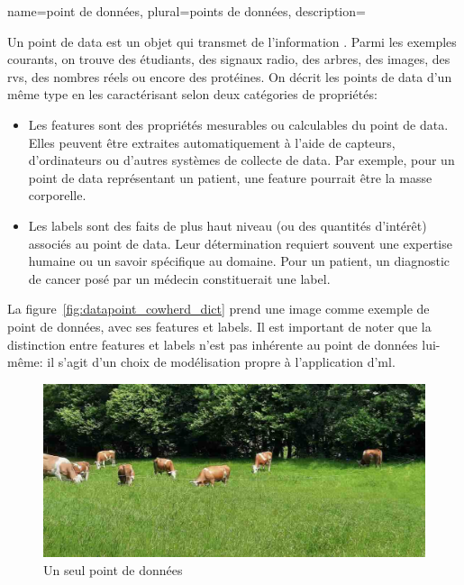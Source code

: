 {name={point de données}, 
	plural={points de données},
	description={Un point de \gls{data} est un objet qui transmet de l'information \cite{coverthomas}. 
		Parmi les exemples courants, on trouve des étudiants, des signaux radio, des arbres, des images, 
		des \glspl{rv}, des nombres réels ou encore des protéines. On décrit les points de \gls{data} d’un même type en les caractérisant selon deux catégories de propriétés:
		\begin{itemize}
			\item Les \glspl{feature} sont des propriétés mesurables ou calculables du point de \gls{data}. 
			Elles peuvent être extraites automatiquement à l’aide de capteurs, d’ordinateurs ou d’autres 
			systèmes de collecte de \gls{data}. Par exemple, pour un point de \gls{data} représentant un patient, 
			une \gls{feature} pourrait être la masse corporelle.
			\item Les \glspl{label} sont des faits de plus haut niveau (ou des quantités d’intérêt) 
			associés au point de \gls{data}. Leur détermination requiert souvent une expertise humaine ou 
			un savoir spécifique au domaine. Pour un patient, un diagnostic de cancer posé par un médecin 
			constituerait une \gls{label}.
		\end{itemize}
		La figure~\ref{fig:datapoint_cowherd_dict} prend une image comme exemple de point de données, 
		avec ses \glspl{feature} et \glspl{label}. Il est important de noter que la distinction entre 
		\glspl{feature} et \glspl{label} n’est pas inhérente au point de données lui-même: 
		il s’agit d’un choix de modélisation propre à l’application d'\gls{ml}.
		\begin{figure}[htbp]
			\centering
			\begin{minipage}[t]{0.95\textwidth}
				\centering
				\includegraphics[width=\textwidth]{../../assets/CowsAustria.jpg}
				\caption*{Un seul point de données}
				\vspace{5mm}

\end{minipage}
\end{figure}}}
